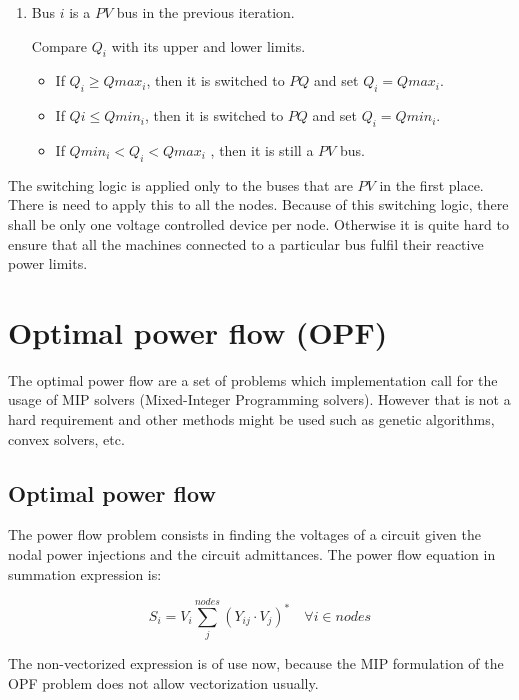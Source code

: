 \documentclass[nols,a4paper,twoside,symmetric,notoc,fleqn]{tufte-book}
\begin{document}
\begin{enumerate}
	\item Bus $i$ is a $PV$ bus in the previous iteration.
	
	Compare $Q_i$ with its upper and lower limits.
	
	\begin{itemize}
		\item If $Q_i \geq Qmax_i$, then it is switched to $PQ$ and set $Q_i = Qmax_i$.
		\item If $Qi \leq Qmin_i$, then it is switched to $PQ$ and set $Q_i = Qmin_i$.
		\item If $Qmin_i < Q_i < Qmax_i$ , then it is still a $PV$ bus.
	\end{itemize}
\end{enumerate}

The switching logic is applied only to the buses that are $PV$ in the first place. There is need to apply this to all the nodes. Because of this switching logic, there shall be only one voltage controlled device per node. Otherwise it is quite hard to ensure that all the machines connected to a particular bus fulfil their reactive power limits.


\chapter{Optimal power flow (OPF)}

The optimal power flow are a set of problems which implementation call for the usage of MIP solvers (Mixed-Integer Programming solvers). However that is not a hard requirement and other methods might be used such as genetic algorithms, convex solvers, etc.


\section{Optimal power flow}

The power flow problem consists in finding the voltages of a circuit given the nodal power injections and the circuit admittances. The power flow equation in summation expression is:

\begin{equation}
S_i=V_i \sum_j^{nodes} \left(Y_{ij} \cdot V_j\right) ^* \quad  \forall i \in nodes
\end{equation}

The non-vectorized expression is of use now, because the MIP formulation of the OPF problem does not allow vectorization usually.
\end{document}
